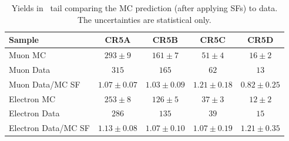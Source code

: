 \begin{table}[!h]
\begin{center}
\begin{tabular}{l||c|c|c|c}
\hline
Sample              & CR5A & CR5B & CR5C & CR5D \\
\hline
\hline
Muon MC 		  & $293 \pm 9$ & $161 \pm 7$ & $51 \pm 4$ & $16 \pm 2$ \\
Muon Data 		  & $315$ & $165$ & $62$ & $13$ \\
\hline
Muon Data/MC SF 	  & $1.07 \pm 0.07$ & $1.03 \pm 0.09$ & $1.21 \pm 0.18$ & $0.82 \pm 0.25$ \\
\hline
\hline
Electron MC 		  & $253 \pm 8$ & $126 \pm 5$ & $37 \pm 3$ & $12 \pm 2$ \\
Electron Data 		  & $286$ & $135$ & $39$ & $15$ \\
\hline
Electron Data/MC SF 	  & $1.13 \pm 0.08$ & $1.07 \pm 0.10$ & $1.07 \pm 0.19$ & $1.21 \pm 0.35$ \\
\hline
\end{tabular}
\caption{ Yields in \mt\ tail comparing the MC prediction (after
  applying SFs) to data. The uncertainties are statistical only.
\label{tab:cr5yields}}
\end{center}
\end{table}

